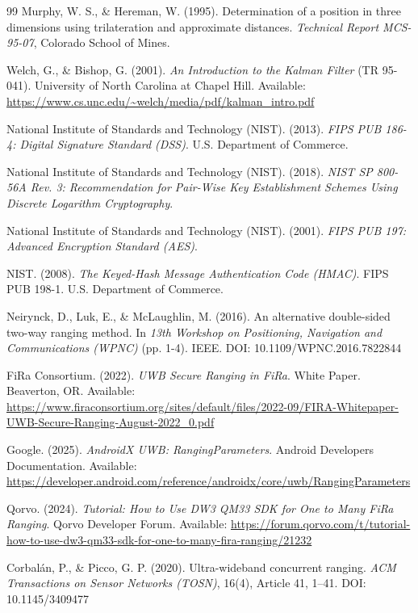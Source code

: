 \begin{thebibliography}{99}
Murphy, W. S., \& Hereman, W. (1995). Determination of a position in three dimensions using trilateration and approximate distances. \textit{Technical Report MCS-95-07}, Colorado School of Mines.

Welch, G., \& Bishop, G. (2001). \textit{An Introduction to the Kalman Filter} (TR 95-041). University of North Carolina at Chapel Hill. Available: \url{https://www.cs.unc.edu/~welch/media/pdf/kalman_intro.pdf}

National Institute of Standards and Technology (NIST). (2013). \textit{FIPS PUB 186-4: Digital Signature Standard (DSS)}. U.S. Department of Commerce.

National Institute of Standards and Technology (NIST). (2018). \textit{NIST SP 800-56A Rev. 3: Recommendation for Pair-Wise Key Establishment Schemes Using Discrete Logarithm Cryptography}.

National Institute of Standards and Technology (NIST). (2001). \textit{FIPS PUB 197: Advanced Encryption Standard (AES)}.

NIST. (2008). \textit{The Keyed-Hash Message Authentication Code (HMAC)}. FIPS PUB 198-1. U.S. Department of Commerce.

Neirynck, D., Luk, E., \& McLaughlin, M. (2016). An alternative double-sided two-way ranging method. In \textit{13th Workshop on Positioning, Navigation and Communications (WPNC)} (pp. 1-4). IEEE. DOI: 10.1109/WPNC.2016.7822844

FiRa Consortium. (2022). \textit{UWB Secure Ranging in FiRa}. White Paper. Beaverton, OR. Available: \url{https://www.firaconsortium.org/sites/default/files/2022-09/FIRA-Whitepaper-UWB-Secure-Ranging-August-2022_0.pdf}

Google. (2025). \textit{AndroidX UWB: RangingParameters}. Android Developers Documentation. Available: \url{https://developer.android.com/reference/androidx/core/uwb/RangingParameters}

Qorvo. (2024). \textit{Tutorial: How to Use DW3 QM33 SDK for One to Many FiRa Ranging}. Qorvo Developer Forum. Available: \url{https://forum.qorvo.com/t/tutorial-how-to-use-dw3-qm33-sdk-for-one-to-many-fira-ranging/21232}

Corbalán, P., \& Picco, G. P. (2020). Ultra-wideband concurrent ranging. \textit{ACM Transactions on Sensor Networks (TOSN)}, 16(4), Article 41, 1--41. DOI: 10.1145/3409477



\end{thebibliography}
